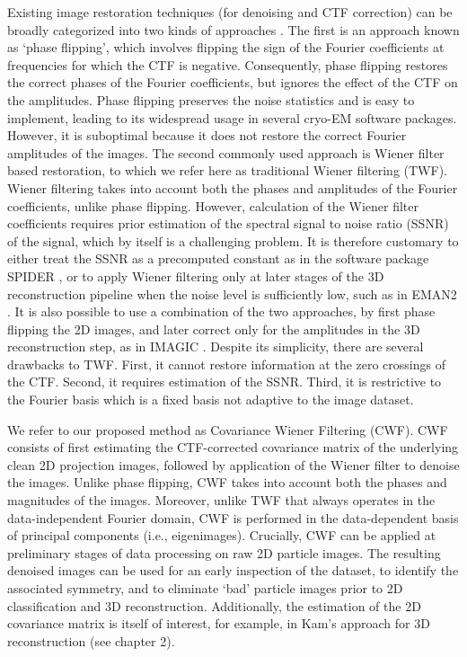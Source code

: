 Existing image restoration techniques (for denoising and CTF correction) can be 
broadly categorized into two kinds of approaches \cite{Penczek_image}.
The first is an approach known as `phase flipping', which involves 
flipping the sign of the Fourier coefficients at frequencies for which the CTF 
is negative.
Consequently, phase flipping restores the correct phases of the Fourier 
coefficients, but ignores the effect of the CTF on the
amplitudes. Phase flipping preserves the noise statistics and is easy to 
implement, leading to its widespread usage in several cryo-EM software packages.
However, it is suboptimal because it does not restore the correct
Fourier amplitudes of the images. The second commonly used approach is Wiener 
filter based restoration, to which we refer here as traditional Wiener filtering (TWF). 
Wiener filtering takes into account both the phases and amplitudes
of the Fourier coefficients, unlike phase flipping. However, calculation of the 
Wiener filter coefficients requires prior estimation
of the spectral signal to noise ratio (SSNR) of the signal, which by itself is a challenging 
problem. It is therefore customary to either
treat the SSNR as a precomputed constant as in the software package SPIDER 
\cite{spider}, or to
apply Wiener filtering only at later stages of the 3D reconstruction pipeline 
when the noise level is sufficiently low, such as in
EMAN2 \cite{eman2}. It is also possible to use a combination of the two 
approaches, by first phase flipping the 2D images,
and later correct only for the amplitudes in the 3D reconstruction step, as in 
IMAGIC \cite{imagic, imagic2}. Despite its simplicity,
there are several drawbacks to TWF. First, it cannot restore information at the 
zero 
crossings of the CTF. Second, it requires estimation of the SSNR. Third, it is
restrictive to the Fourier basis which is a fixed basis not adaptive to the 
image dataset.

We refer to our proposed method as Covariance
Wiener Filtering (CWF). CWF consists
of first estimating the CTF-corrected covariance matrix of the underlying clean 
2D projection images, followed by application of the Wiener filter
to denoise the images. Unlike phase flipping, CWF takes into 
account both the phases and magnitudes
of the images. Moreover, unlike TWF that always operates in the data-independent 
Fourier domain, CWF is performed in the data-dependent basis of principal 
components (i.e., eigenimages).
Crucially, CWF can be applied at preliminary
stages of data processing on raw 2D particle images. The resulting denoised 
images can be used for an early inspection of the dataset,
to identify the associated symmetry, and to eliminate `bad' particle images 
prior to 2D classification and 3D reconstruction. Additionally, the estimation 
of the
2D covariance matrix is itself of interest, for example, in Kam's approach for 
3D reconstruction \cite{kam1980, Bhamre2014} (see chapter 2).


